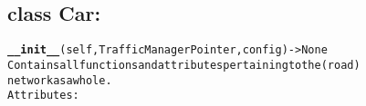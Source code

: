 \subsection{class Car:}
\begin{alltt}

\textbf{__init__}(self, TrafficManagerPointer, config) -> None
Contains all functions and attributes pertaining to the (road) 
network as a whole.
Attributes:

\end{alltt}